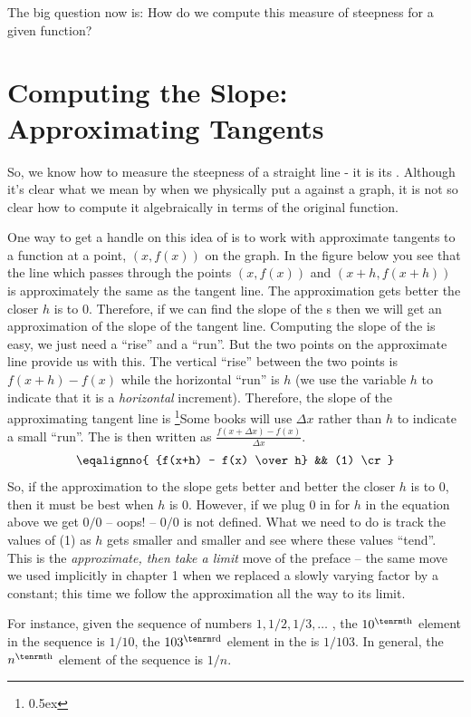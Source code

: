 The big question now is: How do we compute this measure of 
steepness for a given function?

\section{Computing the Slope: Approximating Tangents}
So, we know how to measure the steepness of a straight line - it is its 
. Although it's clear what we mean by 
 when we physically put a  
against a graph, it is not so clear how to compute it algebraically
in terms of the original function. 

One way to get a handle on this idea of  is to work with approximate 
tangents to a function at a point, $(x, f(x))$ on the graph. 
In the figure below you see that the line which passes through the points 
$(x, f(x))$ and $(x+h, f(x+h))$ is approximately the same as the 
tangent line. The approximation gets better the closer $h$ is to $0$.
Therefore, 
if we can find the slope of the s then we will get an 
approximation of the slope of the tangent line. Computing the slope 
of the  is easy, we just need a ``rise'' and a ``run''. 
But the two points on the approximate line provide us with this.
The vertical ``rise'' between the two points is $f(x+h) - f(x)$ while the 
horizontal ``run'' is 
$h$ (we use the variable $h$ to indicate that it is a 
{\it horizontal\/} increment). 
Therefore, the slope of the approximating tangent line is%
\footnote{\kern 0.5pt \raise 0.5ex \hbox{\dag}}{Some books will use $\Delta x$ 
rather than $h$ to indicate a small ``run''. The 
is then written as
$\frac{f(x + \Delta x) - f(x)}{\Delta x}$.}
$$
\eqalignno{
{f(x+h) - f(x) \over h} && (1) \cr
}
$$
So, if the approximation to the slope gets better and better the closer
$h$ is to $0$, then it must be best when $h$ is $0$. 
However, if we plug $0$ in for $h$
in the equation above we get $0/0$ -- oops! -- $0/0$ is not defined.
What we need to do is track the values of (1) as $h$
gets smaller and smaller
and see where these values ``tend''.
This is the {\it approximate, then take a limit\/} move of the preface --
the same move we used implicitly in chapter 1 when we replaced a slowly
varying factor by a constant; this time we follow the approximation all
the way to its limit.

For instance, given the sequence of numbers 
$1, 1/2, 1/3, \ldots $ , the $10^{\rm th}$ element in the sequence is $1/10$, 
the $103^{\rm rd}$ element in the  is $1/103$. In general, the $n^{\rm th}$ 
element of the sequence is 
$1/n$. 

